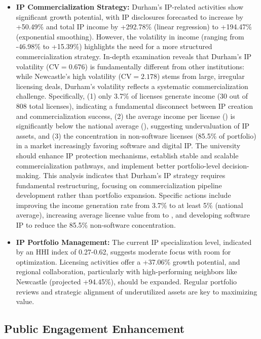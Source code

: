 \documentclass[journal,onecolumn, 10pt,draftclsnofoot]{IEEEtran}
\begin{document}
\begin{itemize}
    \item \textbf{IP Commercialization Strategy:} Durham's IP-related activities show significant growth potential, with IP disclosures forecasted to increase by +50.49\% and total IP income by +292.78\% (linear regression) to +194.47\% (exponential smoothing). However, the volatility in income (ranging from -46.98\% to +15.39\%) highlights the need for a more structured commercialization strategy. In-depth examination reveals that Durham's IP volatility ($\mathrm{CV}=0.676$) is fundamentally different from other institutions: while Newcastle's high volatility ($\mathrm{CV}=2.178$) stems from large, irregular licensing deals, Durham's volatility reflects a systematic commercialization challenge. Specifically, (1) only 3.7\% of licenses generate income (30 out of 808 total licenses), indicating a fundamental disconnect between IP creation and commercialization success, (2) the average income per license () is significantly below the national average (), suggesting undervaluation of IP assets, and (3) the concentration in non-software licenses (85.5\% of portfolio) in a market increasingly favoring software and digital IP. The university should enhance IP protection mechanisms, establish stable and scalable commercialization pathways, and implement better portfolio-level decision-making. This analysis indicates that Durham's IP strategy requires fundamental restructuring, focusing on commercialization pipeline development rather than portfolio expansion. Specific actions include improving the income generation rate from 3.7\% to at least 5\% (national average), increasing average license value from  to , and developing software IP to reduce the 85.5\% non-software concentration.
    
    \item \textbf{IP Portfolio Management:} The current IP specialization level, indicated by an HHI index of 0.27-0.62, suggests moderate focus with room for optimization. Licensing activities offer a +37.06\% growth potential, and regional collaboration, particularly with high-performing neighbors like Newcastle (projected +94.45\%), should be expanded. Regular portfolio reviews and strategic alignment of underutilized assets are key to maximizing value.
\end{itemize}

\subsection{Public Engagement Enhancement}
\end{document}
